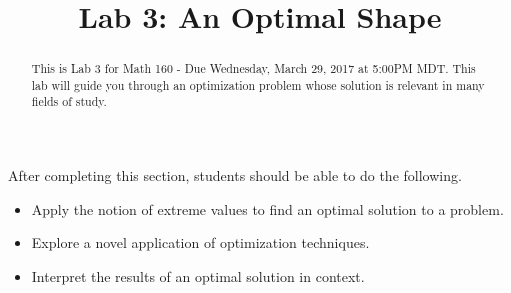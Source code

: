 \documentclass{ximera}
\title{Lab 3: An Optimal Shape}
\begin{document}
\begin{abstract}
This is Lab 3 for Math 160 - Due Wednesday, March 29, 2017 at 5:00PM MDT. This lab will guide you through an optimization problem whose solution is relevant in many fields of study.
\end{abstract}

\maketitle

\begin{sectionOutcomes}

After completing this section, students should be able to do the following.

\begin{itemize}
\item Apply the notion of extreme values to find an optimal solution to a problem.
\item Explore a novel application of optimization techniques.
\item Interpret the results of an optimal solution in context.
\end{itemize}

\end{sectionOutcomes}
\end{document}

